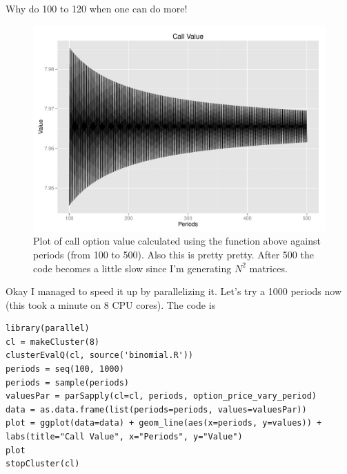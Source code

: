 \documentclass[11pt]{scrartcl}
\begin{document}
Why do 100 to 120 when one can do more!

\begin{figure}[H]
\centering\includegraphics[width=\textwidth]{./hw6/problem3-500.pdf}
\caption{Plot of call option value calculated using the function above against periods (from 100 to 500). Also this is pretty pretty. After 500 the code becomes a little slow since I'm generating $N^2$ matrices.}
\end{figure}

Okay I managed to speed it up by parallelizing it. Let's try a 1000 periods now (this took a minute on 8 CPU cores). The code is

\begin{lstlisting}
library(parallel)
cl = makeCluster(8)
clusterEvalQ(cl, source('binomial.R'))
periods = seq(100, 1000)
periods = sample(periods)
valuesPar = parSapply(cl=cl, periods, option_price_vary_period)
data = as.data.frame(list(periods=periods, values=valuesPar))
plot = ggplot(data=data) + geom_line(aes(x=periods, y=values)) + labs(title="Call Value", x="Periods", y="Value")
plot
stopCluster(cl)
\end{lstlisting}
\end{document}

